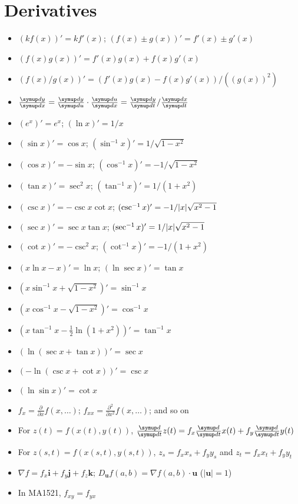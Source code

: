 \documentclass{slnotes}
\DeclarePairedDelimiter\abs{\lvert}{\rvert}%
\begin{document}
\section{Derivatives}
\begin{itemize}
\item \((kf(x))' = kf'(x)\); \((f(x) \pm g(x))' = f'(x) \pm g'(x)\)
\item \((f(x)g(x))' = f'(x)g(x) + f(x)g'(x)\)
\item \((f(x)/g(x))' = (f'(x)g(x)-f(x)g'(x))/((g(x))^2)\)
\item \(\sldd{y}{x} = \sldd{y}{u} \cdot \sldd{u}{x} = \sldd{y}{t}/\sldd{x}{t}\)
\item \((e^x)' = e^x\); \((\ln x)' = 1/x\)
\item \((\sin x)' = \cos x\); \((\sin^{-1} x)' = 1/\sqrt{1-x^2}\)
\item \((\cos x)' = -\sin x\); \((\cos^{-1} x)' = -1/\sqrt{1-x^2}\)
\item \((\tan x)' = \sec^2 x\); \((\tan^{-1} x)' = 1/(1+x^2)\)
\item \((\csc x)' = -\csc x \cot x\); \((\csc^{-1} x)' = -1/\abs{x}\sqrt{x^2-1}\)
\item \((\sec x)' = \sec x \tan x\); \((\sec^{-1} x)' = 1/\abs{x}\sqrt{x^2-1}\)
\item \((\cot x)' = -\csc^2 x\); \((\cot^{-1} x)' = -1/(1+x^2)\)
\item \((x\ln x - x)' = \ln x\); \((\ln\sec x)' = \tan x\)
\item \((x\sin^{-1}x + \sqrt{1-x^2})' = \sin^{-1}x\)
\item \((x\cos^{-1}x - \sqrt{1-x^2})' = \cos^{-1}x\)
\item \((x\tan^{-1}x-\frac{1}{2}\ln(1+x^2))' = \tan^{-1}x\)
\item \((\ln(\sec x + \tan x))' = \sec x\)
\item \((-\ln(\csc x + \cot x))' = \csc x\)
\item \((\ln\sin x)' = \cot x\)
\item \(f_x = \frac{\partial}{\partial x} f(x, \hdots)\); \(f_{xx} = \frac{\partial^2}{\partial x^2} f(x, \hdots)\); and so on
\item For \(z(t) = f(x(t), y(t))\), \(\sldd{}{t} z(t) = f_x \sldd{}{t} x(t) + f_y \sldd{}{t} y(t)\)
\item For \(z(s, t) = f(x(s, t), y(s, t))\), \(z_s = f_xx_s + f_yy_s\) and \(z_t = f_xx_t + f_yy_t\)
\item \(\nabla f = f_x\mathbf{i} + f_y\mathbf{j} + f_z\mathbf{k}\); \(D_{\mathbf{u}}f(a, b) = \nabla f(a, b)\cdot\mathbf{u}\) (\(\lvert\mathbf{u}\rvert = 1\))
\item In MA1521, \(f_{xy} = f_{yx}\)
\end{itemize}
\end{document}

